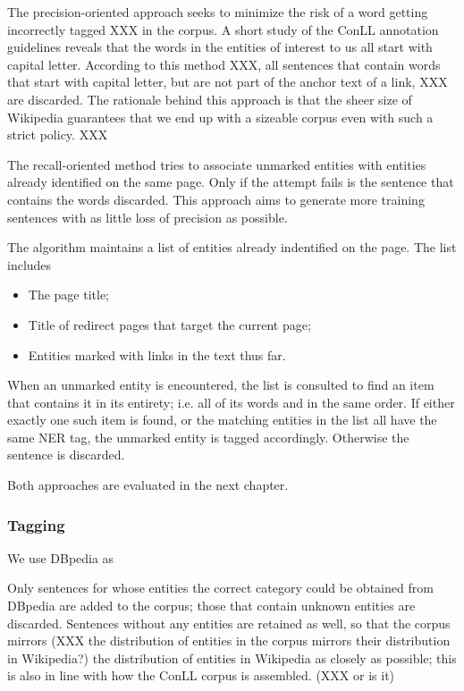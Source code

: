 \documentclass[11pt]{article}
\begin{document}

The precision-oriented approach seeks to minimize the risk of a word getting incorrectly tagged XXX in the corpus. A short study of the ConLL annotation guidelines reveals that the words in the entities of interest to us all start with capital letter. According to this method XXX, all sentences that contain words that start with capital letter, but are not part of the anchor text of a link, XXX are discarded. The rationale behind this approach is that the sheer size of Wikipedia guarantees that we end up with a sizeable corpus even with such a strict policy. XXX

The recall-oriented method tries to associate unmarked entities with entities already identified on the same page. Only if the attempt fails is the sentence that contains the words discarded. This approach aims to generate more training sentences with as little loss of precision as possible. 

The algorithm maintains a list of entities already indentified on the page. The list includes
\begin{itemize}
\item The page title; %
\item Title of redirect pages that target the current page; %
\item Entities marked with links in the text thus far.
\end{itemize}

When an unmarked entity is encountered, the list is consulted to find an item that contains it in its entirety; i.e. all of its words and in the same order. If either exactly one such item is found, or the matching entities in the list all have the same NER tag, the unmarked entity is tagged accordingly. Otherwise the sentence is discarded.

Both approaches are evaluated in the next chapter.

\subsubsection{Tagging}

We use DBpedia as 

Only sentences for whose entities the correct category could be obtained from DBpedia are added to the corpus; those that contain unknown entities are discarded. Sentences without any entities are retained as well, so that the corpus mirrors (XXX the distribution of entities in the corpus mirrors their distribution in Wikipedia?) the distribution of entities in Wikipedia as closely as possible; this is also in line with how the ConLL corpus is assembled. (XXX or is it)
\end{document}
